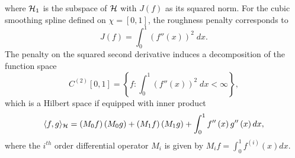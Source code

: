 \noindent
where $\mathcal{H}_1$ is the subspace of $\mathcal{H}$ with $J\left(f\right)$ as its squared norm. For the cubic smoothing spline defined on $\chi = \left[0,1\right]$, the roughness penalty corresponds to 
\begin{equation} \label{eq:SS-penalty-functional}
J\left(f\right) = \int_0^1  \left(f''\left(x\right)\right)^2\;dx.
\end{equation}
\noindent
The penalty on the squared second derivative induces a decomposition of the function space
\begin{equation*}
C^{\left(2\right)}\left[0,1\right] = \left\{f: \int_{0}^1 \left(f''\left(x\right)\right)^2\;dx < \infty \right\},
\end{equation*}
\noindent %
which is a Hilbert space if equipped with inner product
\begin{align} \label{eq:SS-RKHS-inner-product}
\langle f,g \rangle_\hilbert=\left(M_{0} f \right)\left(M_{0} g\right) + \left(M_{1} f\right) \left(M_{1} g\right) + \int_0^1 f''\left(x\right)g''\left(x\right)dx,%
\end{align}
\noindent
where the $i^{th}$ order differential operator $M_i$ is given by $M_i f = \int_0^1 f^{\left( i \right)}\left(x\right) dx$. 

\noindent


\bigskip
 
